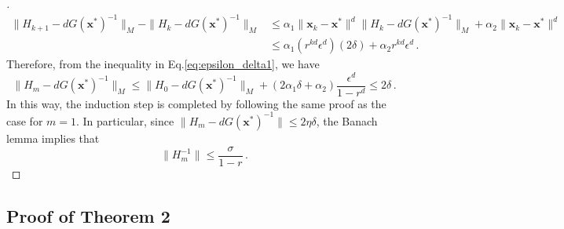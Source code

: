 \documentclass{statsoc}
\newcommand{\bx}{\boldsymbol{x}}
\begin{document}
\begin{proof}[]
\begin{align*}
    \|H_{k+1} - dG(\bx^\ast)^{-1}\|_M - \|H_k - dG(\bx^\ast)^{-1}\|_M &\leq \alpha_1\|\bx_k - \bx^\ast\|^d\|H_k - dG(\bx^\ast)^{-1}\|_M + \alpha_2 \|\bx_k - \bx^\ast\|^d \\
    &\leq \alpha_1 (r^{kd}\epsilon^d)(2\delta) + \alpha_2 r^{kd}\epsilon^d\,.
\end{align*}
Therefore, from the inequality in Eq.\eqref{eq:epsilon_delta1}, we have
\[
\|H_m - dG(\bx^\ast)^{-1}\|_M \leq \|H_0 - dG(\bx^\ast)^{-1}\|_M + (2 \alpha_1 \delta + \alpha_2)\dfrac{\epsilon^d}{1 - r^d} \leq 2\delta\,.
\]
In this way, the induction step is completed by following the same proof as the case for $m=1$. In particular, since $\|H_m - dG(\bx^\ast)^{-1}\| \leq 2\eta \delta$, the Banach lemma implies that
\[
\|H_m^{-1}\| \leq \dfrac{\sigma}{1-r}\,.
\]

\end{proof}

\subsection{Proof of Theorem 2}
\end{document}
